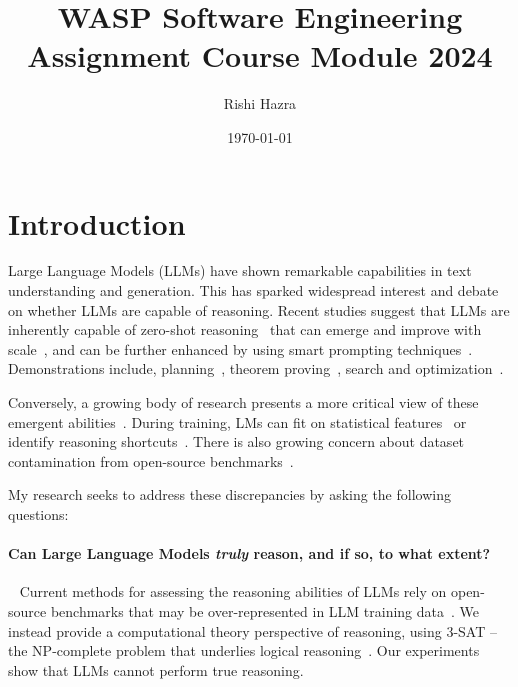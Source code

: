 \documentclass[11pt]{article}
\begin{document}
\title{WASP Software Engineering Assignment Course Module 2024}
\author{Rishi Hazra}
\date{\today}
\maketitle

\section{Introduction}
Large Language Models (LLMs) have shown remarkable capabilities in text understanding and generation. This has sparked widespread interest and debate on whether LLMs are capable of reasoning. Recent studies suggest that LLMs are inherently capable of zero-shot reasoning~\cite{llms_zero_shot_reasoners} that can emerge and improve with scale~\cite{wei2022emergent}, and can be further enhanced by using smart prompting techniques~\cite{chain_of_thought,leasttomost}. Demonstrations include, planning~\cite{llms_zero_shot_planners,saycanpay}, theorem proving~\cite{natural_prover}, search and optimization~\cite{llms_as_optimizers}. 

Conversely, a growing body of research presents a more critical view of these emergent abilities~\cite{gpt4_cant_reason,llms_cant_plan,gpt_graph_coloring}. During training, LMs can fit on statistical features~\cite{paradox_of_learning_to_reason} or identify reasoning shortcuts~\cite{pitfalls_of_next_token_prediction}. There is also growing concern about dataset contamination from open-source benchmarks~\cite{zhang2024careful}.

\vspace{5mm}
\hspace{-6mm}My research seeks to address these discrepancies by asking the following questions:
\vspace{-5mm}
\paragraph{Can Large Language Models \emph{truly}  reason, and if so, to what extent?}~\cite{can_llms_reason_3sat}
Current methods for assessing the reasoning abilities of LLMs rely on open-source benchmarks that may be over-represented in LLM training data~\cite{zhang2024careful}. We instead provide a computational theory perspective of reasoning, using 3-SAT – the NP-complete problem that underlies logical reasoning~\cite{Gomes,garey_johnson}. Our experiments show that LLMs cannot perform true reasoning.
\end{document}
